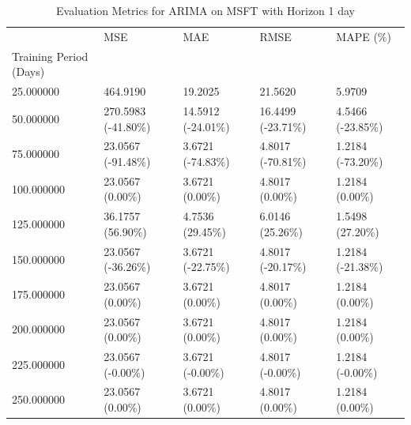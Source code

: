 \begin{table}
\caption{Evaluation Metrics for ARIMA on MSFT with Horizon 1 day}
\label{tab:arima_MSFT_h1_metrics}
\begin{tabular}{lllll}
\toprule
 & MSE & MAE & RMSE & MAPE (\%) \\
Training Period (Days) &  &  &  &  \\
\midrule
25.000000 & 464.9190 & 19.2025 & 21.5620 & 5.9709 \\
50.000000 & 270.5983 (-41.80\%) & 14.5912 (-24.01\%) & 16.4499 (-23.71\%) & 4.5466 (-23.85\%) \\
75.000000 & 23.0567 (-91.48\%) & 3.6721 (-74.83\%) & 4.8017 (-70.81\%) & 1.2184 (-73.20\%) \\
100.000000 & 23.0567 (0.00\%) & 3.6721 (0.00\%) & 4.8017 (0.00\%) & 1.2184 (0.00\%) \\
125.000000 & 36.1757 (56.90\%) & 4.7536 (29.45\%) & 6.0146 (25.26\%) & 1.5498 (27.20\%) \\
150.000000 & 23.0567 (-36.26\%) & 3.6721 (-22.75\%) & 4.8017 (-20.17\%) & 1.2184 (-21.38\%) \\
175.000000 & 23.0567 (0.00\%) & 3.6721 (0.00\%) & 4.8017 (0.00\%) & 1.2184 (0.00\%) \\
200.000000 & 23.0567 (0.00\%) & 3.6721 (0.00\%) & 4.8017 (0.00\%) & 1.2184 (0.00\%) \\
225.000000 & 23.0567 (-0.00\%) & 3.6721 (-0.00\%) & 4.8017 (-0.00\%) & 1.2184 (-0.00\%) \\
250.000000 & 23.0567 (0.00\%) & 3.6721 (0.00\%) & 4.8017 (0.00\%) & 1.2184 (0.00\%) \\
\bottomrule
\end{tabular}
\end{table}
